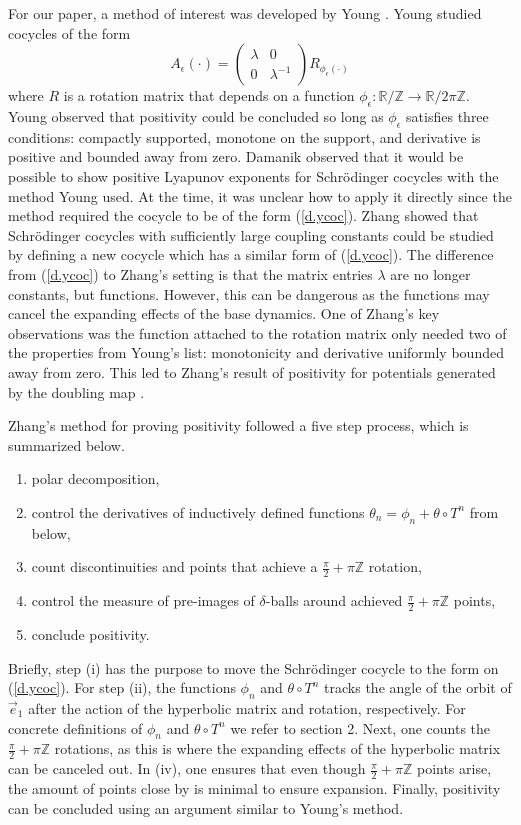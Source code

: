 \documentclass{amsart}
\newcommand{\RR}{\mathbb{R}}
\newcommand{\ZZ}{\mathbb{Z}}
\begin{document}
For our paper, a method of interest was developed by Young \cite{young}. Young studied cocycles of the form 
\begin{equation}\label{d.ycoc}
    A_\epsilon(\cdot) = \begin{pmatrix}
    \lambda & 0\\
    0 & \lambda^{-1}
    \end{pmatrix}R_{\phi_\epsilon(\cdot)}
\end{equation}
where $R$ is a rotation matrix that depends on a function $\phi_\epsilon: \RR/\ZZ \rightarrow \RR/2\pi\ZZ$. Young observed that positivity could be concluded so long as $\phi_\epsilon$ satisfies three conditions: compactly supported, monotone on the support, and derivative is positive and bounded away from zero. Damanik \cite[Problem 6]{Dam} observed that it would be possible to show positive Lyapunov exponents for Schr\"odinger cocycles with the method Young used. At the time, it was unclear how to apply it directly since the method required the cocycle to be of the form (\ref{d.ycoc}). Zhang showed that Schr\"odinger cocycles with sufficiently large coupling constants could be studied by defining a new cocycle which has a similar form of (\ref{d.ycoc}). The difference from (\ref{d.ycoc}) to Zhang's setting is that the matrix entries $\lambda$ are no longer constants, but functions. However, this can be dangerous as the functions may cancel the expanding effects of the base dynamics. One of Zhang's key observations was the function attached to the rotation matrix only needed two of the properties from Young's list: monotonicity and derivative uniformly bounded away from zero. This led to Zhang's result of positivity for potentials generated by the doubling map \cite{zhenghe2}.

Zhang's method for proving positivity followed a five step process, which is summarized below.
\begin{enumerate}
    \item[(i)] polar decomposition,
    \item[(ii)] control the derivatives of inductively defined functions $\theta_n = \phi_n + \theta \circ T^n$ from below,
    \item[(iii)] count discontinuities and points that achieve a $\frac{\pi}{2}+\pi\ZZ$ rotation,
    \item[(iv)] control the measure of pre-images of $\delta$-balls around achieved $\frac{\pi}{2}+ \pi\ZZ$ points,
    \item[(v)] conclude positivity.
\end{enumerate}
Briefly, step (i) has the purpose to move the Schr\"odinger cocycle to the form on (\ref{d.ycoc}). For step (ii), the functions $\phi_n$ and $\theta \circ T^n$ tracks the angle of the orbit of $\vec{e}_1$ after the action of the hyperbolic matrix and rotation, respectively. For concrete definitions of $\phi_n$ and $\theta\circ T^n$ we refer to section 2. Next, one counts the $\frac{\pi}{2}+\pi \ZZ$ rotations, as this is where the expanding effects of the hyperbolic matrix can be canceled out. In (iv), one ensures that even though $\frac{\pi}{2}+\pi\ZZ$ points arise, the amount of points close by is minimal to ensure expansion. Finally, positivity can be concluded using an argument similar to Young's method.
\end{document}
